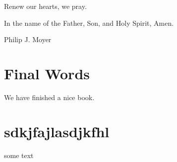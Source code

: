 \documentclass[]{book}
\begin{document}
Renew our hearts, we pray.

In the name of the Father, Son, and Holy Spirit, Amen.

Philip J. Moyer

\hypertarget{final-words}{%
\chapter{Final Words}\label{final-words}}

We have finished a nice book.

\hypertarget{sdkjfajlasdjkfhl}{%
\chapter{sdkjfajlasdjkfhl}\label{sdkjfajlasdjkfhl}}

some text


\end{document}
